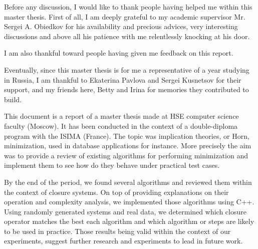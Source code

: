 \documentclass[a4paper, 10pt]{report}
\begin{document}
	
	
	

	



Before any discussion, I would like to thank people having helped me within this master thesis. First of all, I am deeply grateful to my academic supervisor Mr. Sergei A. Obiedkov for his availability and precious advices, very interesting discussions and above all his patience with me relentlessly knocking at his door.

I am also thankful toward people having given me feedback on this report.

Eventually, since this master thesis is for me a representative of a year studying in Russia, I am thankful to Ekaterina Pavlova and Sergei Kusnetsov for their support, and my friends here, Betty and Irina for memories they contributed to build.

\newpage
\listoffigures
\newpage

\newpage
\listoftables
\newpage

\newpage
\listofalgorithms
\newpage



This document is a report of a master thesis made at HSE computer science faculty (Moscow). It has been conducted in the context of a double-diploma program with the ISIMA (France). The topic was implication theories, or Horn, minimization, used in database applications for instance. More precisely the aim was to provide a review of existing algorithms for performing minimization and implement them to see how do they behave under practical test cases.

\vspace{1.2em}

By the end of the period, we found several algorithms and reviewed them within the context of closure systems. On top of providing explanations on their operation and complexity analysis, we implemented those algorithms using C++.
Using randomly generated systems and real data, we determined which closure operator matches the best each algorithm and which algorithm or steps are likely to be used in practice. Those results being valid within the context
of our experiments, suggest further research and experiments to lead in future work.
\end{document}
